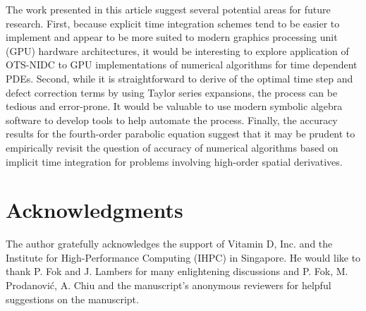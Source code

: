 \documentclass[fleqn,12pt,twoside]{article}
\begin{document}
The work presented in this article suggest several potential areas for future
research.  First, because explicit time integration schemes tend to be easier
to implement and appear to be more suited to modern graphics processing unit
(GPU) hardware architectures,
it would be interesting to explore application of OTS-NIDC to GPU
implementations of numerical algorithms for time dependent PDEs.  Second,
while it is straightforward to derive of the optimal time step and defect
correction terms by using Taylor series expansions, the process can be tedious
and error-prone.  It would be valuable to use modern symbolic algebra software
to develop tools to help automate the process.  Finally, the accuracy results
for the fourth-order parabolic equation suggest that it may be prudent to 
empirically revisit the question of accuracy of numerical algorithms based
on implicit time integration for problems involving high-order spatial
derivatives. 

\section*{Acknowledgments}
The author gratefully acknowledges the support of Vitamin D, Inc.
and the Institute for High-Performance Computing (IHPC) in Singapore. 
He would like to thank P. Fok and J. Lambers for many enlightening 
discussions and P. Fok, M. Prodanovi\'c, A. Chiu and the manuscript's
anonymous reviewers for helpful suggestions on the manuscript.  


%
\end{document}
